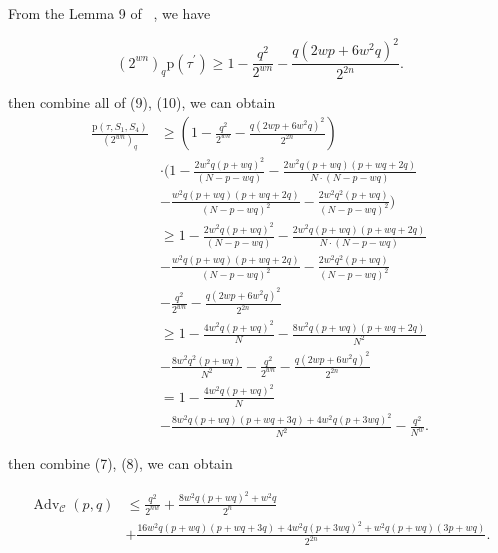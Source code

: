 From the Lemma 9 of ~\cite{cogliati2018wide}, we have

$$
\left(2^{w n}\right)_{q} \mathrm{p}\left(\tau^{\prime}\right) \geq 1-\frac{q^{2}}{2^{w n}}-\frac{q\left(2 w p+6 w^{2} q\right)^{2}}{2^{2 n}}.
$$

\noindent then combine all of (9), (10), we can obtain
$$
\begin{aligned}
\frac{\mathrm{p}\left(\tau, S_{1}, S_{4}\right)}{\left(2^{w n}\right)_{q}} &\geq (1-\frac{q^{2}}{2^{w n}}-\frac{q\left(2 w p+6 w^{2} q\right)^{2}}{2^{2 n}})\\
&\cdot (1- \frac{2 w^{2} q (p+w q)^{2}}{(N-p-w q)} -\frac{2 w^{2} q (p+w q)(p+w q+2 q)}{N \cdot (N-p-w q)}\\
&- \frac{w^{2} q (p+w q)(p+w q+2 q)}{(N-p-w q)^2} - \frac{2 w^{2} q^{2} (p+w q)}{(N- p- wq)^2})\\
&\geq 1- \frac{2 w^{2} q (p+w q)^{2}}{(N-p-w q)} -\frac{2 w^{2} q (p+w q)(p+w q+2 q)}{N \cdot (N-p-w q)}\\
&- \frac{w^{2} q (p+w q)(p+w q+2 q)}{(N-p-w q)^2} - \frac{2 w^{2} q^{2} (p+w q)}{(N- p- wq)^2}\\
& -\frac{q^{2}}{2^{w n}}-\frac{q\left(2 w p+6 w^{2} q\right)^{2}}{2^{2 n}}\\
&\geq 1- \frac{4 w^2 q(p+wq)^2}{N} - \frac{8 w^2 q(p+w q)(p+w q +2 q)}{N^2}\\
&- \frac{8 w^2 q^2(p+w q)}{N^2} - \frac{q^{2}}{2^{w n}}-\frac{q\left(2 w p+6 w^{2} q\right)^{2}}{2^{2 n}}\\
&= 1- \frac{4 w^2 q(p+wq)^2}{N}\\
&- \frac{8 w^2 q(p+w q)(p+w q +3 q)+4 w^2 q(p+3 wq)^2}{N^2} -\frac{q^2}{N^w}.
\end{aligned}
$$

\noindent then combine (7), (8), we can obtain

$$
\begin{aligned}
\operatorname{Adv}_{\mathcal{C}}\left(p, q\right) &\leq \frac{q^2}{2^{n w}} + \frac{8 w^2 q(p+wq)^2+w^2 q}{2^n}\\
&+ \frac{16 w^2 q(p+w q)(p+w q +3 q)+4 w^2 q(p+3 wq)^2+ w^2q(p+w q)(3p+w q)}{2^{2 n}}.
\end{aligned}
$$




